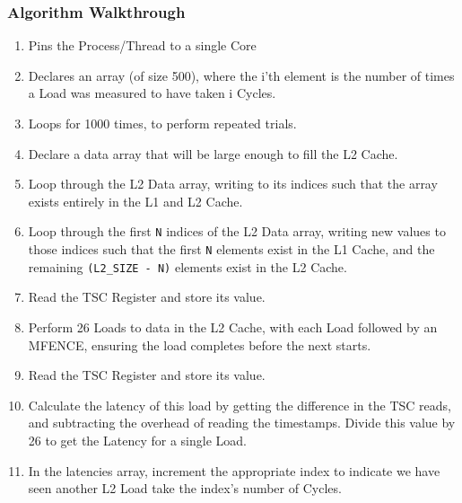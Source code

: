 \documentclass[bsc,frontabs,twoside,singlespacing,parskip,deptreport]{infthesis}     %
\begin{document}
\subsubsection{Algorithm Walkthrough}
\begin{enumerate}
    \item Pins the Process/Thread to a single Core
    \item Declares an array (of size 500), where the i'th element is the number of times a Load was measured to have taken i Cycles.
    \item Loops for 1000 times, to perform repeated trials.
    \item Declare a data array that will be large enough to fill the L2 Cache.
    \item Loop through the L2 Data array, writing to its indices such that the array exists entirely in the L1 and L2 Cache.
    \item Loop through the first \texttt{N} indices of the L2 Data array, writing new values to those indices such that the first \texttt{N} elements exist in the L1 Cache, and the remaining \texttt{(L2\_SIZE - N)} elements exist in the L2 Cache.
    \item Read the TSC Register and store its value.
    \item Perform 26 Loads to data in the L2 Cache, with each Load followed by an MFENCE\cite{mfence_spec}, ensuring the load completes before the next starts.
    \item Read the TSC Register and store its value.
    \item Calculate the latency of this load by getting the difference in the TSC reads, and subtracting the overhead of reading the timestamps. Divide this value by 26 to get the Latency for a single Load.
    \item In the latencies array, increment the appropriate index to indicate we have seen another L2 Load take the index's number of Cycles.
\end{enumerate}
\end{document}

